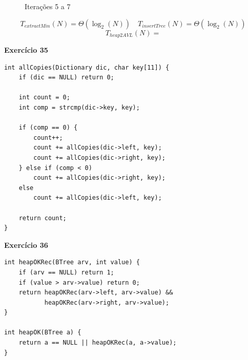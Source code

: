\documentclass[a4paper,11pt]{article}
\begin{document}
\begin{figure}[H]
\begin{minipage}{0.49\textwidth}
		\caption{Iterações 5 a 7}
	\end{minipage}
\end{figure}

\[
	T_{extractMin}(N) = \Theta(\log_2(N)) \quad T_{insertTree}(N) = \Theta(\log_2(N))
\]
\[
	T_{heap2AVL}(N) = 
\]

\noindent \textbf{Exercício 35}

\begin{verbatim}
int allCopies(Dictionary dic, char key[11]) {
	if (dic == NULL) return 0;
	
	int count = 0;
	int comp = strcmp(dic->key, key);
	
	if (comp == 0) {
		count++;
		count += allCopies(dic->left, key);
		count += allCopies(dic->right, key);
	} else if (comp < 0)
		count += allCopies(dic->right, key);
	else
		count += allCopies(dic->left, key);
	
	return count;
}
\end{verbatim}

\noindent \textbf{Exercício 36}

\begin{verbatim}
int heapOKRec(BTree arv, int value) {
	if (arv == NULL) return 1;
	if (value > arv->value) return 0;
	return heapOKRec(arv->left, arv->value) &&
		   heapOKRec(arv->right, arv->value);
}

int heapOK(BTree a) {
	return a == NULL || heapOKRec(a, a->value);
}
\end{verbatim}
\end{document}
